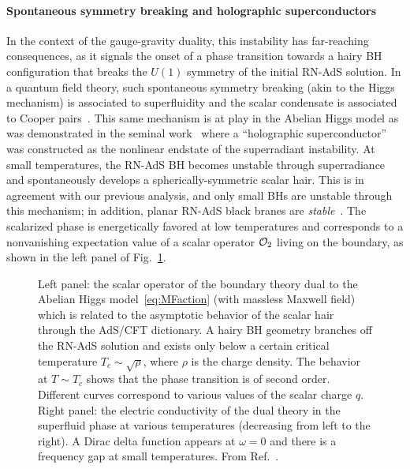 \documentclass[11pt]{article}
\numberwithin{equation}{section} %
\begin{document}
\paragraph{Spontaneous symmetry breaking and holographic superconductors}
In the context of the gauge-gravity duality, this instability has far-reaching consequences, as it signals the onset of a phase transition towards a hairy BH configuration that breaks the $U(1)$ symmetry of the initial RN-AdS solution. In a quantum field theory, such spontaneous symmetry breaking (akin to the Higgs mechanism) is associated to superfluidity and the scalar condensate is associated to Cooper pairs~\cite{Hartnoll:2009sz,Hartnoll:2011fn}.
This same mechanism is at play in the Abelian Higgs model as was demonstrated in the seminal work~\cite{Hartnoll:2008vx} 
where a ``holographic superconductor'' was constructed as the nonlinear endstate of the superradiant instability. At 
small temperatures, the RN-AdS BH becomes unstable through superradiance and spontaneously develops a 
spherically-symmetric scalar hair. This is in agreement with our previous analysis, and only small BHs are unstable 
through this mechanism; in addition, planar RN-AdS black branes are {\it stable}~\cite{Dias:2011tj}.
%
The scalarized phase is energetically favored at low temperatures and corresponds to a nonvanishing expectation value of a scalar operator ${\cal O}_2$ living on the boundary, as shown in the left panel of Fig.~\ref{fig:HSC}. 

%
\begin{figure}
\caption{Left panel: the scalar operator of the boundary theory dual to the Abelian Higgs model~\eqref{eq:MFaction} (with massless Maxwell field) which is related to the asymptotic behavior of the scalar hair through the AdS/CFT dictionary. A hairy BH geometry branches off the RN-AdS solution and exists only below a certain critical temperature $T_c\sim\sqrt{\rho}$, where $\rho$ is the charge density. The behavior at $T\sim T_c$ shows that the phase transition is of second order. Different curves correspond to various values of the scalar charge $q$.
%
Right panel: the electric conductivity of the dual theory in the superfluid phase at various temperatures (decreasing from left to the right). A Dirac delta function appears at $\omega=0$ and there is a frequency gap at small temperatures.
%
From Ref.~\cite{Hartnoll:2008kx}.
}
\label{fig:HSC}
\end{figure}
%
\end{document}
